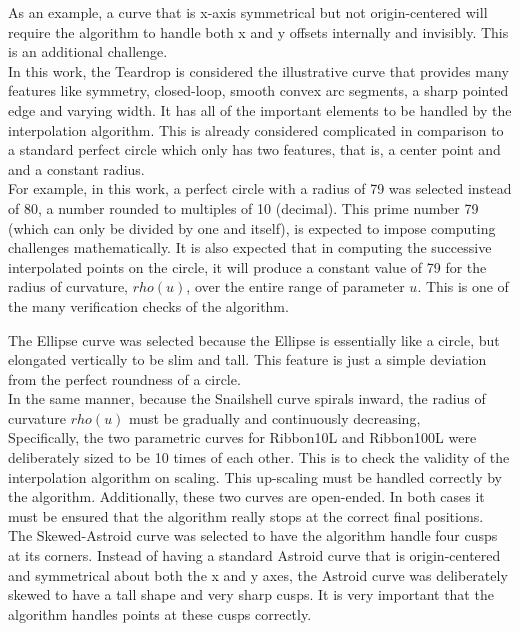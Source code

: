 As an example, a curve that is x-axis symmetrical but not origin-centered will require the algorithm to handle both x and y offsets internally and invisibly. This is an additional challenge.\\ 

In this work, the Teardrop is considered the illustrative curve that provides many features like symmetry, closed-loop, smooth convex arc segments, a sharp pointed edge and varying width. It has all of the important elements to be handled by the interpolation algorithm. This is already considered complicated in comparison to a standard perfect circle which only has two features, that is, a center point and and a constant radius. \\


For example, in this work, a perfect circle with a radius of 79 was selected instead of 80, a number rounded to multiples of 10 (decimal). This prime number 79 (which can only be divided by one and itself), is expected to impose computing challenges mathematically. It is also expected that in computing the successive interpolated points on the circle, it will produce a constant value of 79 for the radius of curvature, $rho(u)$, over the entire range of parameter $u$. This is one of the many verification checks of the algorithm. 


\clearpage
\pagebreak

The Ellipse curve was selected because the Ellipse is essentially like a circle, but elongated vertically to be slim and tall. This feature is just a simple deviation from the perfect roundness of a circle. \\

In the same manner, because the Snailshell curve spirals inward, the radius of curvature $rho(u)$ must be gradually and continuously decreasing, \\ 

Specifically, the two parametric curves for Ribbon10L and Ribbon100L were deliberately sized to be 10 times of each other. This is to check the validity of the interpolation algorithm on scaling. This up-scaling must be handled correctly by the algorithm. Additionally, these two curves are open-ended. In both cases it must be ensured that the algorithm really stops at the correct final positions.\\

The Skewed-Astroid curve was selected to have the algorithm handle four cusps at its corners. Instead of having a standard Astroid curve that is origin-centered and symmetrical about both the x and y axes, the Astroid curve was deliberately skewed to have a tall shape and very sharp cusps. It is very important that the algorithm handles points at these cusps correctly.\\ 

